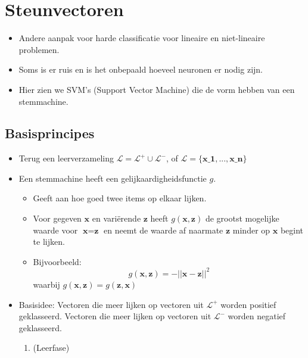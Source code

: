 \chapter{Steunvectoren}
\begin{itemize}
    \item Andere aanpak voor harde classificatie voor lineaire en niet-lineaire problemen.
    \item Soms is er ruis en is het onbepaald hoeveel neuronen er nodig zijn.
    \item Hier zien we SVM's (Support Vector Machine) die de vorm hebben van een stemmachine.
\end{itemize}
\section{Basisprincipes}
\begin{itemize}
    \item Terug een leerverzameling $\mathcal{L} = \mathcal{L}^+ \cup \mathcal{L}^-$, of
    $\mathcal{L} = \{\textbf{x_1}, ..., \textbf{x_n}\}$
    \item Een stemmachine heeft een gelijkaardigheidsfunctie $g$.
    \begin{itemize}
        \item Geeft aan hoe goed twee items op elkaar lijken.
        \item Voor gegeven $\textbf{x}$ en variërende $\textbf{z}$ heeft $g(\textbf{x}, \textbf{z})$ de grootst mogelijke waarde voor $\textbf{x} = \textbf{z}$ en neemt de waarde af naarmate $\textbf{z}$ minder op $\textbf{x}$ begint te lijken.
        \item Bijvoorbeeld:
        $$g(\textbf{x}, \textbf{z}) = - ||\textbf{x} - \textbf{z} ||^2$$
        waarbij $g(\textbf{x}, \textbf{z}) = g(\textbf{z}, \textbf{x})$
    \end{itemize}
    \item Basisidee: Vectoren die meer lijken op vectoren uit $\mathcal{L}^+$ worden positief geklasseerd. Vectoren die meer lijken op vectoren uit $\mathcal{L}^-$ worden negatief geklasseerd.
    \begin{enumerate}
        \item (Leerfase)
        

\end{enumerate}
\end{itemize}
